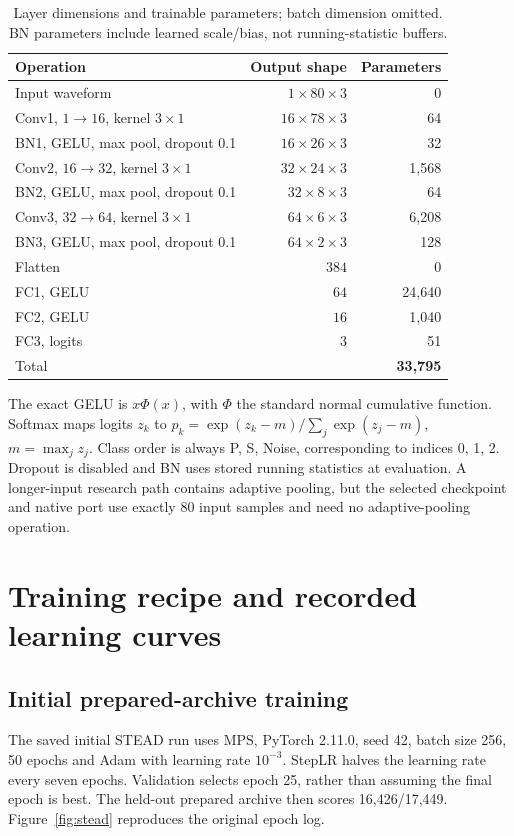 \documentclass[a4paper,11pt,oneside]{article}
\begin{document}
\begin{table}[htbp]\centering\small
\caption{Layer dimensions and trainable parameters; batch dimension omitted.
BN parameters include learned scale/bias, not running-statistic buffers.}
\begin{tabularx}{\linewidth}{Yrr}
\toprule Operation & Output shape & Parameters \\\midrule
Input waveform & $1\times80\times3$ & 0 \\
Conv1, $1\to16$, kernel $3\times1$ & $16\times78\times3$ & 64 \\
BN1, GELU, max pool, dropout 0.1 & $16\times26\times3$ & 32 \\
Conv2, $16\to32$, kernel $3\times1$ & $32\times24\times3$ & 1,568 \\
BN2, GELU, max pool, dropout 0.1 & $32\times8\times3$ & 64 \\
Conv3, $32\to64$, kernel $3\times1$ & $64\times6\times3$ & 6,208 \\
BN3, GELU, max pool, dropout 0.1 & $64\times2\times3$ & 128 \\
Flatten & $384$ & 0 \\
FC1, GELU & $64$ & 24,640 \\
FC2, GELU & $16$ & 1,040 \\
FC3, logits & $3$ & 51 \\\midrule
Total & & \textbf{33,795} \\\bottomrule
\end{tabularx}
\end{table}

The exact GELU is $x\Phi(x)$, with $\Phi$ the standard normal cumulative
function. Softmax maps logits $z_k$ to
$p_k=\exp(z_k-m)/\sum_j\exp(z_j-m)$, $m=\max_jz_j$. Class order is always
P, S, Noise, corresponding to indices 0, 1, 2. Dropout is disabled and BN
uses stored running statistics at evaluation. A longer-input research path
contains adaptive pooling, but the selected checkpoint and native port use
exactly 80 input samples and need no adaptive-pooling operation.
\FloatBarrier

\section{Training recipe and recorded learning curves}
\subsection{Initial prepared-archive training}
The saved initial STEAD run uses MPS, PyTorch 2.11.0, seed 42, batch size 256,
50 epochs and Adam with learning rate $10^{-3}$. StepLR halves the learning
rate every seven epochs. Validation selects epoch 25, rather than assuming
the final epoch is best. The held-out prepared archive then scores
16,426/17,449. Figure~\ref{fig:stead} reproduces the original epoch log.
\end{document}
